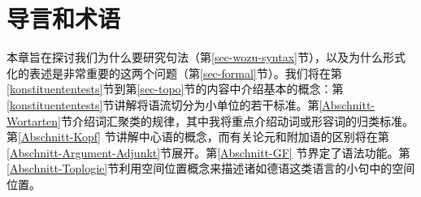 
\chapter{导言和术语}
\label{Kapitel-Grundbegriffe}

本章旨在探讨我们为什么要研究句法（第\ref{sec-wozu-syntax}节），以及为什么形式化的表述是非常重要的这两个问题（第\ref{sec-formal}节）。我们将在第\ref{konstituententests}节到第\ref{sec-topo}节的内容中介绍基本的概念：第\ref{konstituententests}节讲解将语流切分为小单位的若干标准。第\ref{Abschnitt-Wortarten}节介绍词汇聚类的规律，其中我将重点介绍动词或形容词的归类标准。第\ref{Abschnitt-Kopf} 节讲解中心语的概念，而有关论元和附加语的区别将在第\ref{Abschnitt-Argument-Adjunkt}节展开。第\ref{Abschnitt-GF} 节界定了语法功能。第\ref{Abschnitt-Toplogie}节利用空间位置概念来描述诸如德语这类语言的小句中的空间位置。

